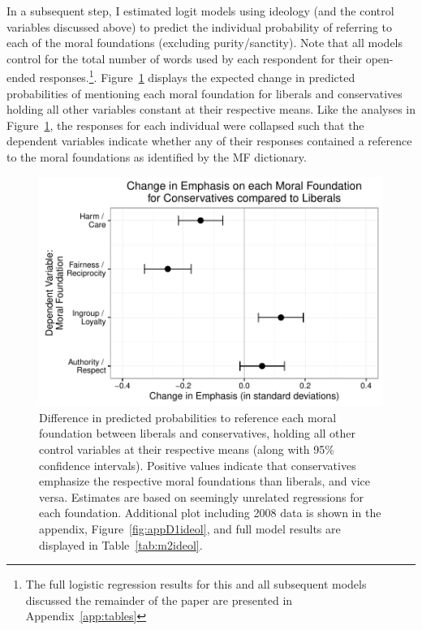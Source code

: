 \documentclass[12pt]{article}
\begin{document}
%
%


In a subsequent step, I estimated logit models using ideology (and the control variables discussed above) to predict the individual probability of referring to each of the moral foundations (excluding purity/sanctity). Note that all models control for the total number of words used by each respondent for their open-ended responses.\footnote{The full logistic regression results for this and all subsequent models discussed the remainder of the paper are presented in Appendix~\ref{app:tables}}. Figure~\ref{fig:2ideol} displays the expected change in predicted probabilities of mentioning each moral foundation for liberals and conservatives holding all other variables constant at their respective means. Like the analyses in Figure~\ref{fig:2ideol}, the responses for each individual were collapsed such that the dependent variables indicate whether any of their responses contained a reference to the moral foundations as identified by the MF dictionary. 

\begin{figure}[h]\centering
\includegraphics[scale=.9]{../calc/fig/fig2ideol.pdf}
\caption{Difference in predicted probabilities to reference each moral foundation between liberals and conservatives, holding all other control variables at their respective means (along with 95\% confidence intervals). Positive values indicate that conservatives emphasize the respective moral foundations than liberals, and vice versa. Estimates are based on seemingly unrelated regressions for each foundation. Additional plot including 2008 data is shown in the appendix, Figure~\ref{fig:appD1ideol}, and full model results are displayed in Table~\ref{tab:m2ideol}.}\label{fig:2ideol}
\end{figure}
\end{document}
